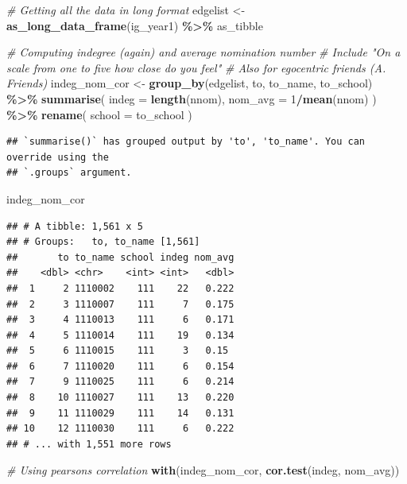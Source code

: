 \documentclass[
]{book}
\newenvironment{Shaded}{\begin{snugshade}}{\end{snugshade}}
\newcommand{\AttributeTok}[1]{\textcolor[rgb]{0.13,0.29,0.53}{#1}}
\newcommand{\CommentTok}[1]{\textcolor[rgb]{0.56,0.35,0.01}{\textit{#1}}}
\newcommand{\DecValTok}[1]{\textcolor[rgb]{0.00,0.00,0.81}{#1}}
\newcommand{\FunctionTok}[1]{\textcolor[rgb]{0.13,0.29,0.53}{\textbf{#1}}}
\newcommand{\NormalTok}[1]{#1}
\newcommand{\OtherTok}[1]{\textcolor[rgb]{0.56,0.35,0.01}{#1}}
\newcommand{\SpecialCharTok}[1]{\textcolor[rgb]{0.81,0.36,0.00}{\textbf{#1}}}
\begin{document}
\begin{Shaded}
\begin{Highlighting}[]
\CommentTok{\# Getting all the data in long format}
\NormalTok{edgelist }\OtherTok{\textless{}{-}} \FunctionTok{as\_long\_data\_frame}\NormalTok{(ig\_year1) }\SpecialCharTok{\%\textgreater{}\%}
\NormalTok{  as\_tibble}

\CommentTok{\# Computing indegree (again) and average nomination number}
\CommentTok{\# Include "On a scale from one to five how close do you feel"}
\CommentTok{\# Also for egocentric friends (A. Friends)}
\NormalTok{indeg\_nom\_cor }\OtherTok{\textless{}{-}} \FunctionTok{group\_by}\NormalTok{(edgelist, to, to\_name, to\_school) }\SpecialCharTok{\%\textgreater{}\%}
  \FunctionTok{summarise}\NormalTok{(}
    \AttributeTok{indeg   =} \FunctionTok{length}\NormalTok{(nnom),}
    \AttributeTok{nom\_avg =} \DecValTok{1}\SpecialCharTok{/}\FunctionTok{mean}\NormalTok{(nnom)}
\NormalTok{  ) }\SpecialCharTok{\%\textgreater{}\%}
  \FunctionTok{rename}\NormalTok{(}
    \AttributeTok{school =}\NormalTok{ to\_school}
\NormalTok{  )}
\end{Highlighting}
\end{Shaded}

\begin{verbatim}
## `summarise()` has grouped output by 'to', 'to_name'. You can override using the
## `.groups` argument.
\end{verbatim}

\begin{Shaded}
\begin{Highlighting}[]
\NormalTok{indeg\_nom\_cor}
\end{Highlighting}
\end{Shaded}

\begin{verbatim}
## # A tibble: 1,561 x 5
## # Groups:   to, to_name [1,561]
##       to to_name school indeg nom_avg
##    <dbl> <chr>    <int> <int>   <dbl>
##  1     2 1110002    111    22   0.222
##  2     3 1110007    111     7   0.175
##  3     4 1110013    111     6   0.171
##  4     5 1110014    111    19   0.134
##  5     6 1110015    111     3   0.15 
##  6     7 1110020    111     6   0.154
##  7     9 1110025    111     6   0.214
##  8    10 1110027    111    13   0.220
##  9    11 1110029    111    14   0.131
## 10    12 1110030    111     6   0.222
## # ... with 1,551 more rows
\end{verbatim}

\begin{Shaded}
\begin{Highlighting}[]
\CommentTok{\# Using pearson\textquotesingle{}s correlation}
\FunctionTok{with}\NormalTok{(indeg\_nom\_cor, }\FunctionTok{cor.test}\NormalTok{(indeg, nom\_avg))}
\end{Highlighting}
\end{Shaded}
\end{document}
